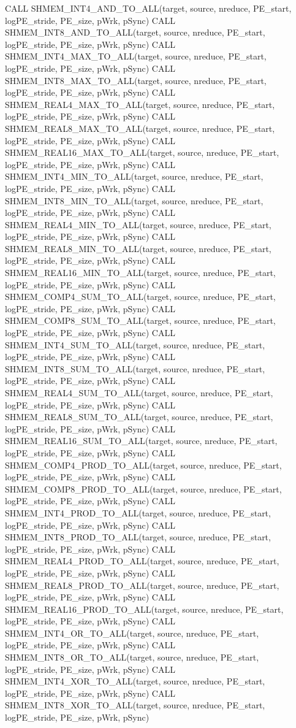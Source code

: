CALL SHMEM_INT4_AND_TO_ALL(target, source, nreduce, PE_start, logPE_stride, PE_size, pWrk, pSync)
CALL SHMEM_INT8_AND_TO_ALL(target, source, nreduce, PE_start, logPE_stride, PE_size, pWrk, pSync)
CALL SHMEM_INT4_MAX_TO_ALL(target, source, nreduce, PE_start, logPE_stride, PE_size, pWrk, pSync)
CALL SHMEM_INT8_MAX_TO_ALL(target, source, nreduce, PE_start, logPE_stride, PE_size, pWrk, pSync)
CALL SHMEM_REAL4_MAX_TO_ALL(target, source, nreduce, PE_start, logPE_stride, PE_size, pWrk, pSync)
CALL SHMEM_REAL8_MAX_TO_ALL(target, source, nreduce, PE_start, logPE_stride, PE_size, pWrk, pSync)
CALL SHMEM_REAL16_MAX_TO_ALL(target, source, nreduce, PE_start, logPE_stride, PE_size, pWrk, pSync)
CALL SHMEM_INT4_MIN_TO_ALL(target, source, nreduce, PE_start, logPE_stride, PE_size, pWrk, pSync)
CALL SHMEM_INT8_MIN_TO_ALL(target, source, nreduce, PE_start, logPE_stride, PE_size, pWrk, pSync)
CALL SHMEM_REAL4_MIN_TO_ALL(target, source, nreduce, PE_start, logPE_stride, PE_size, pWrk, pSync)
CALL SHMEM_REAL8_MIN_TO_ALL(target, source, nreduce, PE_start, logPE_stride, PE_size, pWrk, pSync)
CALL SHMEM_REAL16_MIN_TO_ALL(target, source, nreduce, PE_start, logPE_stride, PE_size, pWrk, pSync)
CALL SHMEM_COMP4_SUM_TO_ALL(target, source, nreduce, PE_start, logPE_stride, PE_size, pWrk, pSync)
CALL SHMEM_COMP8_SUM_TO_ALL(target, source, nreduce, PE_start, logPE_stride, PE_size, pWrk, pSync)
CALL SHMEM_INT4_SUM_TO_ALL(target, source, nreduce, PE_start, logPE_stride, PE_size, pWrk, pSync)
CALL SHMEM_INT8_SUM_TO_ALL(target, source, nreduce, PE_start, logPE_stride, PE_size, pWrk, pSync)
CALL SHMEM_REAL4_SUM_TO_ALL(target, source, nreduce, PE_start, logPE_stride, PE_size, pWrk, pSync)
CALL SHMEM_REAL8_SUM_TO_ALL(target, source, nreduce, PE_start, logPE_stride, PE_size, pWrk, pSync)
CALL SHMEM_REAL16_SUM_TO_ALL(target, source, nreduce, PE_start, logPE_stride, PE_size, pWrk, pSync)
CALL SHMEM_COMP4_PROD_TO_ALL(target, source, nreduce, PE_start, logPE_stride, PE_size, pWrk, pSync)
CALL SHMEM_COMP8_PROD_TO_ALL(target, source, nreduce, PE_start, logPE_stride, PE_size, pWrk, pSync)
CALL SHMEM_INT4_PROD_TO_ALL(target, source, nreduce, PE_start, logPE_stride, PE_size, pWrk, pSync)
CALL SHMEM_INT8_PROD_TO_ALL(target, source, nreduce, PE_start, logPE_stride, PE_size, pWrk, pSync)
CALL SHMEM_REAL4_PROD_TO_ALL(target, source, nreduce, PE_start, logPE_stride, PE_size, pWrk, pSync)
CALL SHMEM_REAL8_PROD_TO_ALL(target, source, nreduce, PE_start, logPE_stride, PE_size, pWrk, pSync)
CALL SHMEM_REAL16_PROD_TO_ALL(target, source, nreduce, PE_start, logPE_stride, PE_size, pWrk, pSync)
CALL SHMEM_INT4_OR_TO_ALL(target, source, nreduce, PE_start, logPE_stride, PE_size, pWrk, pSync)
CALL SHMEM_INT8_OR_TO_ALL(target, source, nreduce, PE_start, logPE_stride, PE_size, pWrk, pSync)	
CALL SHMEM_INT4_XOR_TO_ALL(target, source, nreduce, PE_start, logPE_stride, PE_size, pWrk, pSync)
CALL SHMEM_INT8_XOR_TO_ALL(target, source, nreduce, PE_start, logPE_stride, PE_size, pWrk, pSync) %
\cbend

